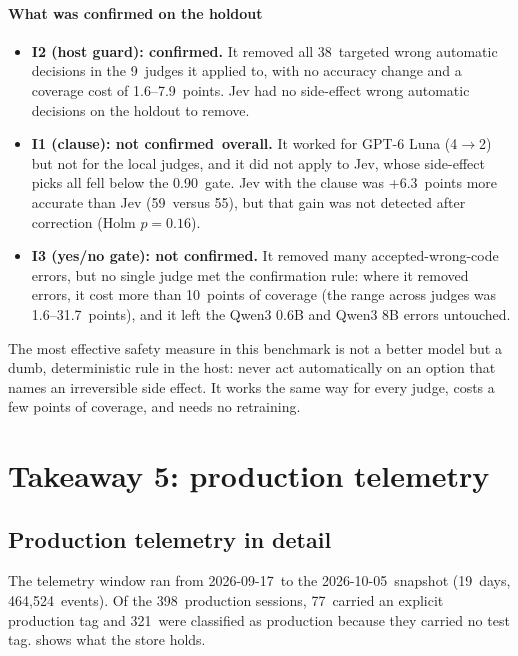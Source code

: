 \documentclass[11pt,letterpaper]{article}
\newcommand{\ObCutoff}{2026-10-05}
\newcommand{\ObDays}{19}
\newcommand{\ObEvents}{464{,}524}
\newcommand{\ObProdDefault}{321}
\newcommand{\ObProdSessions}{398}
\newcommand{\ObProdTagged}{77}
\newcommand{\ObWeekStart}{2026-09-17}
\newcommand{\IConfirmCovPts}{10}
\newcommand{\IOneHoldConfirmed}{not confirmed}
\newcommand{\IOneHoldLunaClAfter}{2}
\newcommand{\IOneHoldLunaClBefore}{4}
\newcommand{\IThreeHoldConfirmed}{not confirmed}
\newcommand{\IThreeHoldCovCostRange}{1.6--31.7}
\newcommand{\ITwoHoldBefore}{38}
\newcommand{\ITwoHoldConfirmed}{confirmed}
\newcommand{\ITwoHoldCovCostRange}{1.6--7.9}
\newcommand{\ITwoHoldNApplicable}{9}
\newcommand{\JevClHoldAccK}{59}
\newcommand{\JevClHoldRAccDiff}{+6.3}
\newcommand{\JevClHoldRAccPHolm}{0.16}
\newcommand{\JevHoldAccK}{55}
\newcommand{\MinP}{0.90}
\begin{document}
\paragraph{What was confirmed on the holdout}
\begin{itemize}
  \item \textbf{I2 (host guard): \ITwoHoldConfirmed.} It removed all \ITwoHoldBefore\ targeted wrong
    automatic decisions in the \ITwoHoldNApplicable\ judges it applied to, with no accuracy change and
    a coverage cost of \ITwoHoldCovCostRange\ points. Jev had no side-effect wrong automatic decisions
    on the holdout to remove.
  \item \textbf{I1 (clause): \IOneHoldConfirmed\ overall.} It worked for GPT-6 Luna
    (\IOneHoldLunaClBefore$\to$\IOneHoldLunaClAfter) but not for the local judges, and it did not apply to
    Jev, whose side-effect picks all fell below the \MinP\ gate. Jev with the clause was
    \JevClHoldRAccDiff\ points more accurate than Jev (\JevClHoldAccK\ versus \JevHoldAccK), but that
    gain was not detected after correction (Holm $p = \JevClHoldRAccPHolm$).
  \item \textbf{I3 (yes/no gate): \IThreeHoldConfirmed.} It removed many accepted-wrong-code errors, but no
    single judge met the confirmation rule: where it removed errors, it cost more than \IConfirmCovPts\
    points of coverage (the range across judges was \IThreeHoldCovCostRange\ points), and it left
    the Qwen3 0.6B and Qwen3 8B errors untouched.
\end{itemize}

\begin{keyidea}
The most effective safety measure in this benchmark is not a better model but a dumb, deterministic
rule in the host: never act automatically on an option that names an irreversible side effect. It works
the same way for every judge, costs a few points of coverage, and needs no retraining.
\end{keyidea}
\section{Takeaway 5: production telemetry}\label{sec:f}

\subsection{Production telemetry in detail}\label{sec:telemetrydetail}

The telemetry window ran from \ObWeekStart\ to the \ObCutoff\ snapshot (\ObDays\ days, \ObEvents\ events). Of the
\ObProdSessions\ production sessions, \ObProdTagged\ carried an explicit production tag and \ObProdDefault\ were
classified as production because they carried no test tag. \Cref{fig:obsmix} shows what the store holds.
\end{document}
